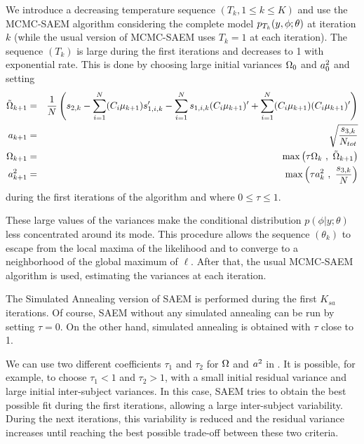 We introduce a decreasing temperature sequence $(T_k, 1\leq k \leq K)$ and use the MCMC-SAEM algorithm considering the complete model $p_{T_k}(y,{\phi};\theta)$  at iteration $k$ (while the usual version of MCMC-SAEM uses $T_k=1$ at each iteration). The sequence $(T_k)$ is large during the first iterations and decreases to 1 with exponential rate. This is done by choosing large initial variances ${\Omega}_0$ and $a^2_0$ and setting
\begin{eqnarray}
 \tilde{\IIV}_{k+1} &=& \frac{1}{N} \left(s_{2,k}- \sum_{i=1}^N(\magi\mugkun)s_{1,i,k}^\prime -\sum_{i=1}^N s_{1,i,k}(\magi\mugkun)^\prime +\sum_{i=1}^N (\magi\mugkun)(\magi\mugkun)^\prime\right)  \\
\ag_{k+1} & = & \sqrt{ \frac{s_{3,k}}{N_{tot}} }\\
\IIV_{k+1} &=& \max\left( \tau \IIV_{k}  \ , \ \tilde{\IIV}_{k+1}  \right)  \label{tau1} \\
\ag^2_{k+1} & = &  \max\left( \tau \ag^2_{k} \ , \  \frac{s_{3,k}}{N} \right) \label{tau2}
\end{eqnarray}
during the first iterations of the algorithm and where $0\leq\tau\leq 1$.

These large values of the variances make the conditional distribution $p(\phi|y;\theta )$ less concentrated around its mode. This procedure allows the sequence $(\theta_k)$ to escape from the local maxima of the likelihood and to converge to a neighborhood of the global maximum of $\ell$. After that, the usual MCMC-SAEM algorithm is used, estimating the variances at each iteration.


 The Simulated Annealing version of SAEM is performed during the first $K_{sa}$ iterations. Of course, SAEM without any simulated annealing can be run by setting $\tau=0$. On the other hand, simulated annealing is obtained with $\tau$ close to 1.

 We can use two different coefficients $\tau_1$ and $\tau_2$ for ${\Omega}$ and $a^2$ in \saemix. It is possible, for example, to choose $\tau_1<1$ and $\tau_2>1$, with a small initial residual variance and large initial inter-subject variances. In this case, SAEM tries to obtain the best possible fit during the first iterations, allowing a large inter-subject variability. During the next iterations, this variability is reduced and the residual variance increases until reaching the best possible trade-off between these two criteria.

